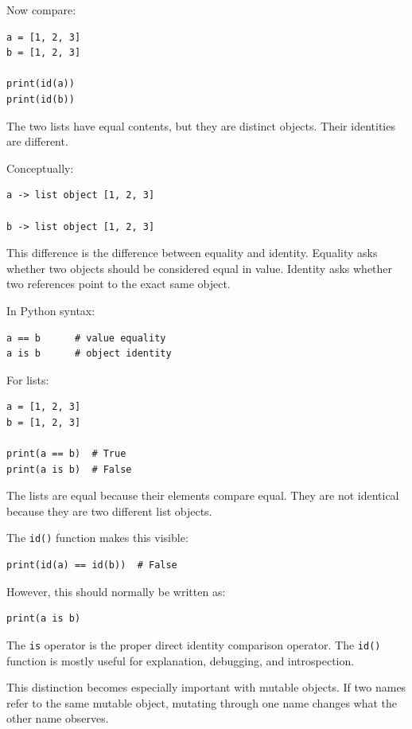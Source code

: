 Now compare:

\begin{verbatim}
a = [1, 2, 3]
b = [1, 2, 3]

print(id(a))
print(id(b))
\end{verbatim}

The two lists have equal contents, but they are distinct objects. Their identities are different.

Conceptually:

\begin{verbatim}
a -> list object [1, 2, 3]

b -> list object [1, 2, 3]
\end{verbatim}

This difference is the difference between equality and identity. Equality asks whether two objects should be considered equal in value. Identity asks whether two references point to the exact same object.

In Python syntax:

\begin{verbatim}
a == b      # value equality
a is b      # object identity
\end{verbatim}

For lists:

\begin{verbatim}
a = [1, 2, 3]
b = [1, 2, 3]

print(a == b)  # True
print(a is b)  # False
\end{verbatim}

The lists are equal because their elements compare equal. They are not identical because they are two different list objects.

The \texttt{id()} function makes this visible:

\begin{verbatim}
print(id(a) == id(b))  # False
\end{verbatim}

However, this should normally be written as:

\begin{verbatim}
print(a is b)
\end{verbatim}

The \texttt{is} operator is the proper direct identity comparison operator. The \texttt{id()} function is mostly useful for explanation, debugging, and introspection.

This distinction becomes especially important with mutable objects. If two names refer to the same mutable object, mutating through one name changes what the other name observes.

